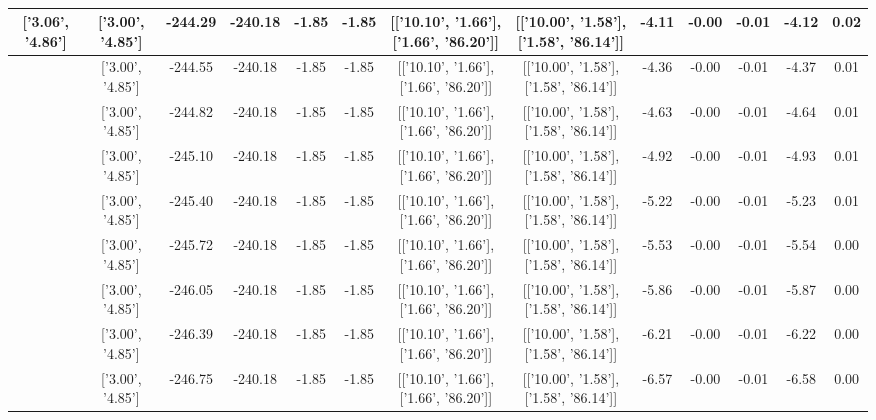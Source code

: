 \begin{table}[htbp]
\begin{adjustbox}{angle=90}
\begin{tabular}{|c|c|c|c|c|c|c|c|c|c|c|c|c|}
 ['3.06', '4.86'] & ['3.00', '4.85'] & -244.29 & -240.18 & -1.85 & -1.85 & [['10.10', '1.66'], ['1.66', '86.20']] & [['10.00', '1.58'], ['1.58', '86.14']] & -4.11 & -0.00 & -0.01 & -4.12 & 0.02\\ \hline
 ['3.07', '4.86'] & ['3.00', '4.85'] & -244.55 & -240.18 & -1.85 & -1.85 & [['10.10', '1.66'], ['1.66', '86.20']] & [['10.00', '1.58'], ['1.58', '86.14']] & -4.36 & -0.00 & -0.01 & -4.37 & 0.01\\ \hline
 ['3.07', '4.86'] & ['3.00', '4.85'] & -244.82 & -240.18 & -1.85 & -1.85 & [['10.10', '1.66'], ['1.66', '86.20']] & [['10.00', '1.58'], ['1.58', '86.14']] & -4.63 & -0.00 & -0.01 & -4.64 & 0.01\\ \hline
 ['3.07', '4.86'] & ['3.00', '4.85'] & -245.10 & -240.18 & -1.85 & -1.85 & [['10.10', '1.66'], ['1.66', '86.20']] & [['10.00', '1.58'], ['1.58', '86.14']] & -4.92 & -0.00 & -0.01 & -4.93 & 0.01\\ \hline
 ['3.08', '4.86'] & ['3.00', '4.85'] & -245.40 & -240.18 & -1.85 & -1.85 & [['10.10', '1.66'], ['1.66', '86.20']] & [['10.00', '1.58'], ['1.58', '86.14']] & -5.22 & -0.00 & -0.01 & -5.23 & 0.01\\ \hline
 ['3.08', '4.86'] & ['3.00', '4.85'] & -245.72 & -240.18 & -1.85 & -1.85 & [['10.10', '1.66'], ['1.66', '86.20']] & [['10.00', '1.58'], ['1.58', '86.14']] & -5.53 & -0.00 & -0.01 & -5.54 & 0.00\\ \hline
 ['3.09', '4.86'] & ['3.00', '4.85'] & -246.05 & -240.18 & -1.85 & -1.85 & [['10.10', '1.66'], ['1.66', '86.20']] & [['10.00', '1.58'], ['1.58', '86.14']] & -5.86 & -0.00 & -0.01 & -5.87 & 0.00\\ \hline
 ['3.09', '4.86'] & ['3.00', '4.85'] & -246.39 & -240.18 & -1.85 & -1.85 & [['10.10', '1.66'], ['1.66', '86.20']] & [['10.00', '1.58'], ['1.58', '86.14']] & -6.21 & -0.00 & -0.01 & -6.22 & 0.00\\ \hline
 ['3.09', '4.86'] & ['3.00', '4.85'] & -246.75 & -240.18 & -1.85 & -1.85 & [['10.10', '1.66'], ['1.66', '86.20']] & [['10.00', '1.58'], ['1.58', '86.14']] & -6.57 & -0.00 & -0.01 & -6.58 & 0.00\\ \hline
            \end{tabular}
        \end{adjustbox}
        \caption{}
        \label{}
    \end{table}
    